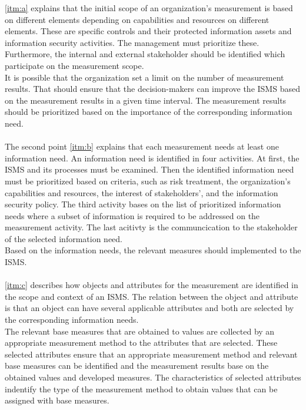 \ref{itm:a} explains that the initial scope of an organization's measurement is based on different elements depending on capabilities and resources on different elements. These are specific controls and their protected information assets  and information security activities. The management must prioritize these. Furthermore, the internal and external stakeholder should be identified which participate on the measurement scope. \\
It is possible that the organization set a limit on the number of measurement results. That should ensure that the decision-makers can improve the ISMS based on the measurement results in a given time interval. The measurement results should be prioritized based on the importance of the corresponding information need. \\ \\
The second point \ref{itm:b} explains that each measurement needs at least one information need. An information need is identified in four activities. At first, the ISMS and its processes must be examined. Then the identified information need must be prioritized based on criteria, such as risk treatment, the organization's capabilities and resources, the interest of stakeholders', and the information security policy. The third activity bases on the list of prioritized information needs where a subset of information is required to be addressed on the measurement activity. The last acitivty is the communcication to the stakeholder of the selected information need. \\
Based on the information needs, the relevant measures should implemented to the ISMS. \\ \\
\ref{itm:c} describes how objects and attributes for the measurement are identified in the scope and context of an ISMS. The relation between the object and attribute is that an object can have several applicable attributes and both are selected by the corresponding information needs. \\
The relevant base measures that are obtained to values are collected by an appropriate measurement method to the attributes that are selected. These selected attributes ensure that an appropriate measurement method and relevant base measures can be identified and the measurement results base on the obtained values and developed measures. The characteristics of selected attributes indentify the type of the measurement method to obtain values that can be assigned with base measures. \\
